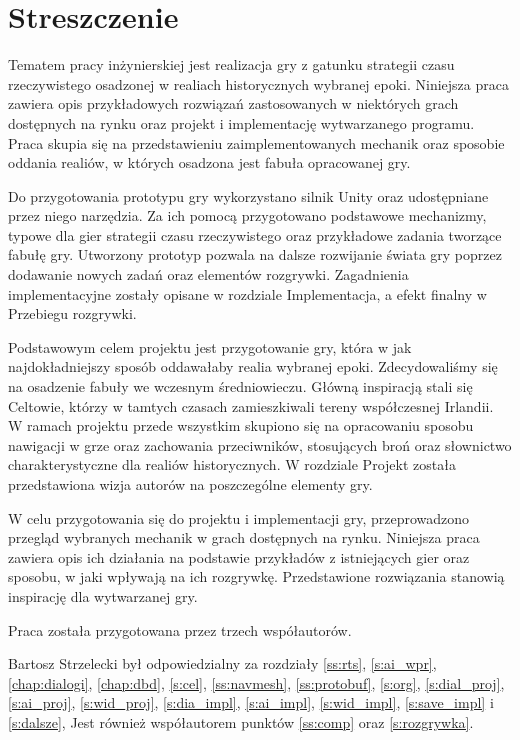 \chapter*{Streszczenie}
Tematem pracy inżynierskiej jest realizacja gry z gatunku strategii czasu rzeczywistego osadzonej w realiach historycznych
wybranej epoki. Niniejsza praca zawiera opis przykładowych rozwiązań zastosowanych w niektórych grach dostępnych na rynku
oraz projekt i implementację wytwarzanego programu. Praca skupia się na przedstawieniu zaimplementowanych mechanik oraz
sposobie oddania realiów, w których osadzona jest fabuła opracowanej gry.

Do przygotowania prototypu gry wykorzystano silnik Unity oraz udostępniane przez niego narzędzia. Za ich pomocą
przygotowano podstawowe mechanizmy, typowe dla gier strategii czasu rzeczywistego oraz przykładowe zadania tworzące
fabułę gry. Utworzony prototyp pozwala na dalsze rozwijanie świata gry poprzez dodawanie nowych zadań oraz elementów
rozgrywki. Zagadnienia implementacyjne zostały opisane w rozdziale Implementacja, a efekt finalny w Przebiegu rozgrywki.

Podstawowym celem projektu jest przygotowanie gry, która w jak najdokładniejszy sposób oddawałaby realia wybranej epoki.
Zdecydowaliśmy się na osadzenie fabuły we wczesnym średniowieczu. Główną inspiracją stali się Celtowie, którzy w
tamtych czasach zamieszkiwali tereny współczesnej Irlandii. W ramach projektu przede wszystkim skupiono się na
opracowaniu sposobu nawigacji w grze oraz zachowania przeciwników, stosujących broń oraz słownictwo charakterystyczne
dla realiów historycznych. W rozdziale Projekt została przedstawiona wizja autorów na poszczególne elementy gry.

W celu przygotowania się do projektu i implementacji gry, przeprowadzono przegląd wybranych mechanik w grach dostępnych
na rynku. Niniejsza praca zawiera opis ich działania na podstawie przykładów z istniejących gier oraz sposobu, w jaki
wpływają na ich rozgrywkę. Przedstawione rozwiązania stanowią inspirację dla wytwarzanej gry.

Praca została przygotowana przez trzech współautorów.

Bartosz Strzelecki był odpowiedzialny za rozdziały \ref{ss:rts}, \ref{s:ai_wpr}, \ref{chap:dialogi}, \ref{chap:dbd},
\ref{s:cel}, \ref{ss:navmesh}, \ref{ss:protobuf}, \ref{s:org}, \ref{s:dial_proj}, \ref{s:ai_proj}, \ref{s:wid_proj},
\ref{s:dia_impl}, \ref{s:ai_impl}, \ref{s:wid_impl}, \ref{s:save_impl} i \ref{s:dalsze},
Jest również współautorem punktów \ref{ss:comp} oraz \ref{s:rozgrywka}.

